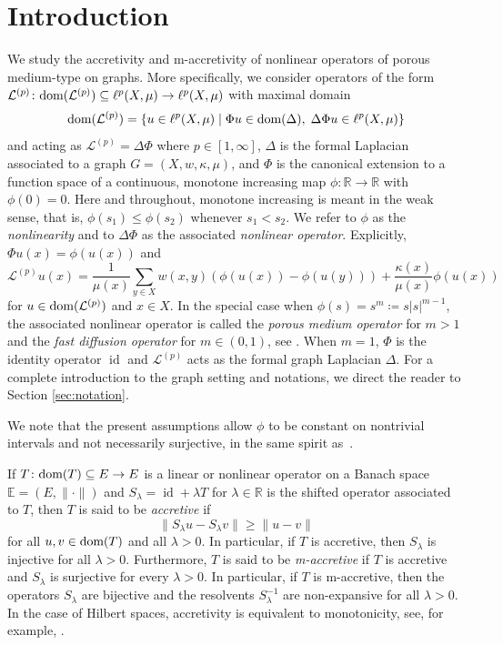 \documentclass[letterpaper]{article}
\theoremstyle{definition}
\theoremstyle{named}
\numberwithin{equation}{section}
\newcommand{\R}{\mathbb{R}}
\newcommand{\lm}{\lambda}
\newcommand{\dom}{\textnormal{dom}} %
\newcommand{\id}{\operatorname{id}}
\newcommand{\Deltaphip}{\mathcal{L}^{(p)}}
\newcommand{\ellp}{\ell^p(X,\mu)}
\begin{document}
\section{Introduction}\label{sec:intro}
We study the accretivity and m-accretivity of nonlinear operators of porous medium-type
on graphs. More specifically, we consider operators of the form 
$\Deltaphip \colon \dom(\Deltaphip)\subseteq \ellp\to \ellp$ with maximal domain
$$\dom(\Deltaphip)= \left\{u \in \ellp \mid \Phi u \in \dom (\Delta),\; \Delta\Phi u \in \ellp\right\}$$
and acting as $\Deltaphip= \Delta\Phi$
where $p\in [1,\infty]$, $\Delta$ is the formal Laplacian associated to a  graph $G=(X,w,\kappa,\mu)$, and 
 $\Phi$ is the canonical extension to a function space of a continuous, monotone
increasing map $\phi \colon \R \to \R$ with $\phi(0)=0$. Here and throughout,
monotone increasing is meant in the weak sense, that is,
$\phi(s_{1}) \leq \phi(s_{2})$ whenever $s_{1} < s_{2}$.  We refer to $\phi$
as the \emph{nonlinearity} and to $\Delta\Phi$ as the associated \emph{nonlinear
operator}.
Explicitly, $\Phi u(x) = \phi(u(x))$ and
$$\Deltaphip u (x) = \frac{1}{\mu(x)}\sum_{y \in X}w(x,y)(\phi(u(x))-\phi(u(y))) + \frac{\kappa(x)}{\mu(x)}\phi(u(x))$$
for $u \in \dom(\Deltaphip)$ and $x \in X$.
In the special case when $\phi(s)=s^m\coloneqq s|s|^{m-1}$, the associated nonlinear 
operator is called the \emph{porous medium operator} for $m>1$ and the \emph{fast diffusion operator} for $m\in (0,1)$, see \cite{vazquez2007porous,bianchi2022generalized}. When $m=1$, $\Phi$ is the identity operator $\id$ and $\Deltaphip$ acts as the formal graph
Laplacian $\Delta$. For a complete introduction to the graph setting and notations, 
we direct the reader to Section \ref{sec:notation}.


We note that the present assumptions allow $\phi$ to be constant on nontrivial intervals
 and not necessarily  surjective, in the same spirit as~\cite{benilan1981continuous}.


If $T \colon \dom(T)\subseteq E \to E$ is a linear or nonlinear operator 
on a Banach space $\mathbb{E}=(E,\|\cdot\|)$ and
$S_\lambda = \id+\lambda T$
for $\lambda \in \R$ is the shifted operator associated to $T$, 
then $T$ is said to be \emph{accretive} if
$$\| S_\lambda u - S_\lambda v \| \geq \|u-v\|$$
for all $u,v\in\dom(T)$ and all $\lambda>0$.
In particular, if $T$ is accretive, then $S_\lambda$ is injective for all $\lm>0$.
Furthermore, $T$ is said to be \emph{m-accretive} if $T$ is accretive and $S_\lambda$ is surjective for every  $\lambda >0$. 
In particular, if $T$ is m-accretive, then the operators $S_\lambda$ are bijective and the resolvents $S_\lambda^{-1}$ are non-expansive for all $\lambda>0$. In the case of Hilbert spaces, accretivity is equivalent to monotonicity, see, for example, \cite[Chapter 13.2]{deimling1985nonlinear}.
\end{document}
